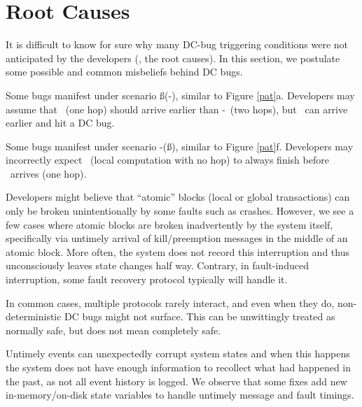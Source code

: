 \section{Root Causes}
\label{sec-root}

It is difficult to know for sure why many DC-bug triggering conditions
were not anticipated by the developers (\ie, the root causes).  In
this section, we postulate some possible and common misbeliefs behind
DC bugs.


Some bugs manifest under scenario \mbc\ss(\mba-\mac), similar to Figure
\ref{pat}a.  Developers may assume that \mbc\ (one hop) should arrive
earlier than \mba-\mac\ (two hops), but
\mac\ can arrive earlier and hit a DC bug.


Some bugs manifest under
scenario \mba-(\lbp\ss\mab), similar to Figure \ref{pat}f.  Developers
may incorrectly expect \lbp\ (local computation with no hop) to always
finish before \mab\ arrives (one hop).  

Developers might believe that ``atomic'' blocks (local or global
transactions) 
can only be broken unintentionally by some faults such as crashes.
However, we see a few cases where atomic blocks are broken inadvertently
by the system itself, specifically via untimely arrival of
kill/preemption messages in the middle of an atomic block.
More often, the system does not record
this interruption
and thus unconsciously leaves state changes half way.  Contrary, in
fault-induced interruption, some fault recovery protocol typically
will handle it.


 In common cases, multiple protocols rarely interact, and
even when they do, non-deterministic DC bugs might not surface.  This can
be unwittingly treated as normally safe, but does not mean
completely safe.


\fi


  Untimely events can
unexpectedly corrupt system states and when this happens the system
does not have enough information to recollect what had happened in the
past, as not all event history is logged.  We observe that some fixes
add new in-memory/on-disk state variables to handle
untimely message and fault timings.






